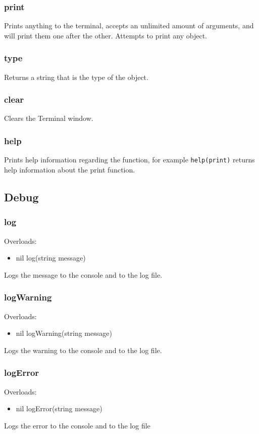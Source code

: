 \documentclass{book}
\newenvironment{ulist}
	{\begin{itemize}
			\itemsep0em}
	{\end{itemize}}
\begin{document}
\subsubsection{print}
Prints anything to the terminal, accepts an unlimited amount of arguments, and will print them one after the other. Attempts to print any object.

\subsubsection{type}
Returns a string that is the type of the object.

\subsubsection{clear}
Clears the Terminal window.

\subsubsection{help}
Prints help information regarding the function, for example \texttt{help(print)} returns help information about the print function.

\subsection{Debug}
\subsubsection{log}
Overloads:
\begin{ulist}
	\item nil log(string message)
\end{ulist}
Logs the message to the console and to the log file.

\subsubsection{logWarning}
Overloads:
\begin{ulist}
	\item nil logWarning(string message)
\end{ulist}
Logs the warning to the console and to the log file.

\subsubsection{logError}
Overloads:
\begin{ulist}
	\item nil logError(string message)
\end{ulist}
Logs the error to the console and to the log file
\end{document}
